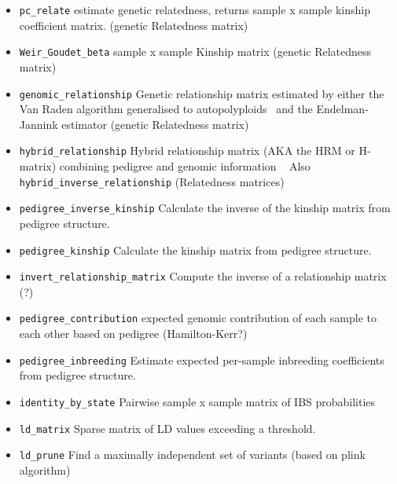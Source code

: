 \documentclass[9pt,lineno]{elife}
\newcommand{\sgapi}[1]{\texttt{#1}}
\begin{document}
\begin{itemize}

\item \sgapi{pc\_relate} estimate genetic relatedness, returns sample x sample
kinship coefficient matrix. \citep{conomos2016model} (genetic Relatedness matrix)

\item \sgapi{Weir\_Goudet\_beta} sample x sample Kinship matrix
\citep{weir2017unified} (genetic Relatedness matrix)

\item \sgapi{genomic\_relationship} Genetic relationship matrix estimated
by either the Van Raden algorithm generalised to
autopolyploids~\citep{vanraden2008efficient,ashraf2016estimating,bilton2020developing}
and the Endelman-Jannink estimator \citep{endelman2011ridge}
(genetic Relatedness matrix)

\item \sgapi{hybrid\_relationship} Hybrid relationship matrix
(AKA the HRM or H-matrix) combining pedigree and genomic information
~\citep{martini2018effect}
Also \sgapi{hybrid\_inverse\_relationship} (Relatedness matrices)

\item \sgapi{pedigree\_inverse\_kinship} Calculate the inverse of the kinship
matrix from pedigree structure.

\item \sgapi{pedigree\_kinship} Calculate the kinship
matrix from pedigree structure.

\item \sgapi{invert\_relationship\_matrix} Compute the inverse of a
relationship matrix (?)

\item \sgapi{pedigree\_contribution} expected genomic contribution of each
sample to each other based on pedigree (Hamilton-Kerr?)

\item \sgapi{pedigree\_inbreeding} Estimate expected per-sample
inbreeding coefficients from pedigree structure.
\citep{hamilton2018computation}

\item \sgapi{identity\_by\_state} Pairwise sample x sample matrix
of IBS probabilities

\item \sgapi{ld\_matrix} Sparse matrix of LD values exceeding a threshold.
\item \sgapi{ld\_prune} Find a maximally independent set of variants
(based on plink algorithm)


\end{itemize}
\end{document}
